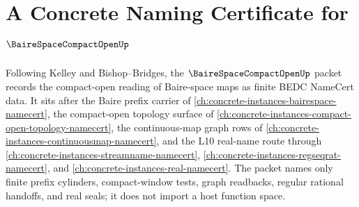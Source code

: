 \chapter{A Concrete Naming Certificate for $\BaireSpaceCompactOpenUp$}
\label{ch:concrete-instances-baire-space-compact-open-namecert}

Following Kelley and Bishop--Bridges, the $\BaireSpaceCompactOpenUp$ packet records the compact-open reading of Baire-space maps as finite BEDC NameCert data. It sits after the Baire prefix carrier of \autoref{ch:concrete-instances-bairespace-namecert}, the compact-open topology surface of \autoref{ch:concrete-instances-compact-open-topology-namecert}, the continuous-map graph rows of \autoref{ch:concrete-instances-continuousmap-namecert}, and the L10 real-name route through \autoref{ch:concrete-instances-streamname-namecert}, \autoref{ch:concrete-instances-regseqrat-namecert}, and \autoref{ch:concrete-instances-real-namecert}. The packet names only finite prefix cylinders, compact-window tests, graph readbacks, regular rational handoffs, and real seals; it does not import a host function space.

